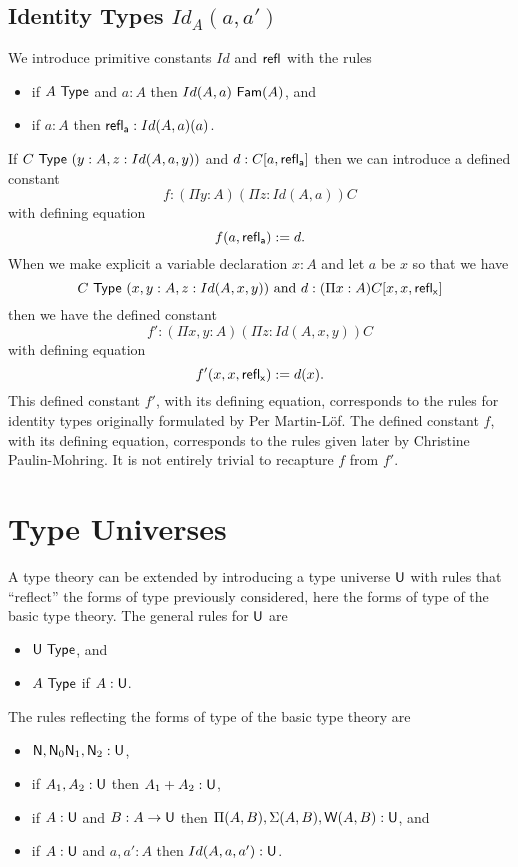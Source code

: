 {\subsection*{Identity Types $Id_A(a,a')$}
We introduce primitive constants $Id$ and ${\sf refl_{}}$ with the rules
\begin{itemize}
\item if $A~{\sf Type}$ and $a:A$ then $Id(A,a)~{\sf Fam}(A)$, and
\item if $a:A$ then ${\sf refl_{a}}:Id(A,a)(a)$.
\end{itemize}
If $C~{\sf Type}~(y:A,z:Id(A,a,y))$ and $d:C[a,{\sf refl_{a}}]$ then we can introduce a defined constant 
  $$f:(\Pi y:A)(\Pi z:Id(A,a))C$$ 
with defining equation
  \[ f(a,{\sf refl_{a}}):= d.\]
When we make explicit a variable declaration $x:A$ 
and let $a$ be $x$ 
so that we have 
  $$C~{\sf Type}~(x,y:A, z:Id(A,x,y))\mbox{ and  }d:(\Pi x:A)C[x,x,{\sf refl_{x}}]$$ 
then we have the defined constant
  $$f':(\Pi x,y:A)(\Pi z:Id(A,x,y))C$$ 
with defining equation
  \[ f'(x,x,{\sf refl_{x}}):= d(x).\]
This defined constant $f'$, with its defining equation, corresponds to the rules for identity types originally formulated by Per Martin-L\"{o}f.   The defined constant $f$, with its defining equation, corresponds to the rules given later by Christine Paulin-Mohring.  It is not entirely trivial to recapture $f$ from $f'$.


\section*{Type Universes}

 A type theory can be extended by introducing a type universe ${\sf U}$ with rules that ``reflect'' the forms of type previously considered, here the forms of type of the basic type theory.  The general rules for ${\sf U}$ are

\begin{itemize}
\item ${\sf U}~{\sf Type}$, and
\item $A~{\sf Type}$ if $A:{\sf U}$.
\end{itemize}

The rules reflecting the forms of type of the basic type theory are

\begin{itemize}
\item ${\sf N},{\sf N}_0{\sf N}_1,{\sf N}_2:{\sf U}$,
\item if $A_1,A_2:{\sf U}$ then $A_1+A_2:{\sf U}$,
\item if $A:{\sf U}$ and $B:A\rightarrow{\sf U}$ then     $\Pi(A,B),\Sigma(A,B),{\sf W}(A,B):{\sf U}$, and 
\item if $A:{\sf U}$ and $a,a':A$ then $Id(A,a,a'):{\sf U}$.
\end{itemize}

}
